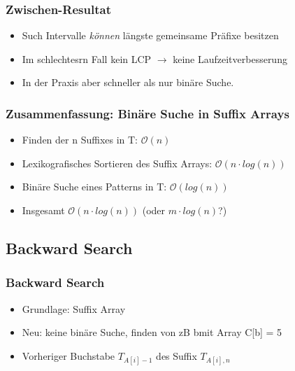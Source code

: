 \documentclass{beamer}
\begin{document}
\begin{frame}
\frametitle{Zwischen-Resultat}
\begin{itemize}
\item Such Intervalle \textit{können} längste gemeinsame Präfixe besitzen
\item Im schlechtesrn Fall kein LCP $\rightarrow$ keine Laufzeitverbesserung
\item In der Praxis aber schneller als nur binäre Suche.
\end{itemize}
\end{frame}

\begin{frame}
\frametitle{Zusammenfassung: Binäre Suche in Suffix Arrays}
\begin{itemize}
\item Finden der n Suffixes in T: $\mathcal{O}(n)$
\item Lexikografisches Sortieren des Suffix Arrays: $\mathcal{O}(n\cdot log (n))$
\item Binäre Suche eines Patterns in T: $\mathcal{O}(log (n))$
\item Insgesamt $\mathcal{O}(n \cdot log (n))$ (oder $m \cdot log (n)$?)
\end{itemize}
\end{frame}
\subsection{Backward Search}
\begin{frame}
\frametitle{Backward Search}
\begin{itemize}
\item Grundlage: Suffix Array
\item Neu: keine binäre Suche, finden von zB \glqq b\grqq mit Array C[\glqq b\grqq ] = 5
\item Vorheriger Buchstabe $T_{A[i]-1}$ des Suffix $T_{A[i],n}$
\end{itemize}
\end{frame}
\end{document}

